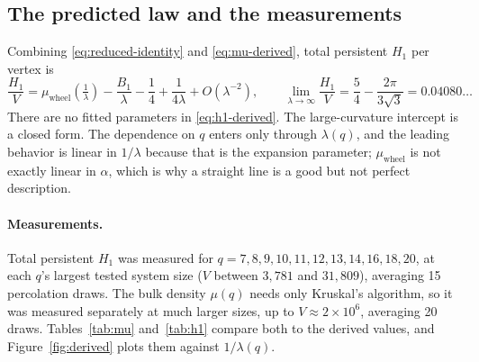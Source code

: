 \documentclass[11pt]{article}
\begin{document}
\subsection{The predicted law and the measurements}
\label{sec:measurements}

Combining \eqref{eq:reduced-identity} and \eqref{eq:mu-derived}, total persistent $H_1$ per vertex is
\begin{equation}
\frac{H_1}{V} = \mu_{\mathrm{wheel}}\!\left(\tfrac1\lambda\right) - \frac{B_1}{\lambda} - \frac14 + \frac{1}{4\lambda} + O(\lambda^{-2}),
\qquad
\lim_{\lambda\to\infty}\frac{H_1}{V} = \frac54 - \frac{2\pi}{3\sqrt3} = 0.04080\ldots
\label{eq:h1-derived}
\end{equation}
There are no fitted parameters in \eqref{eq:h1-derived}. The large-curvature intercept is a closed form. The dependence on $q$ enters only through $\lambda(q)$, and the leading behavior is linear in $1/\lambda$ because that is the expansion parameter; $\mu_{\mathrm{wheel}}$ is not exactly linear in $\alpha$, which is why a straight line is a good but not perfect description.

\paragraph{Measurements.} Total persistent $H_1$ was measured for $q=7,8,9,10,11,12,13,14,16,18,20$, at each $q$'s largest tested system size ($V$ between $3{,}781$ and $31{,}809$), averaging 15 percolation draws. The bulk density $\mu(q)$ needs only Kruskal's algorithm, so it was measured separately at much larger sizes, up to $V\approx2\times10^6$, averaging 20 draws. Tables~\ref{tab:mu} and~\ref{tab:h1} compare both to the derived values, and Figure~\ref{fig:derived} plots them against $1/\lambda(q)$.
\end{document}
